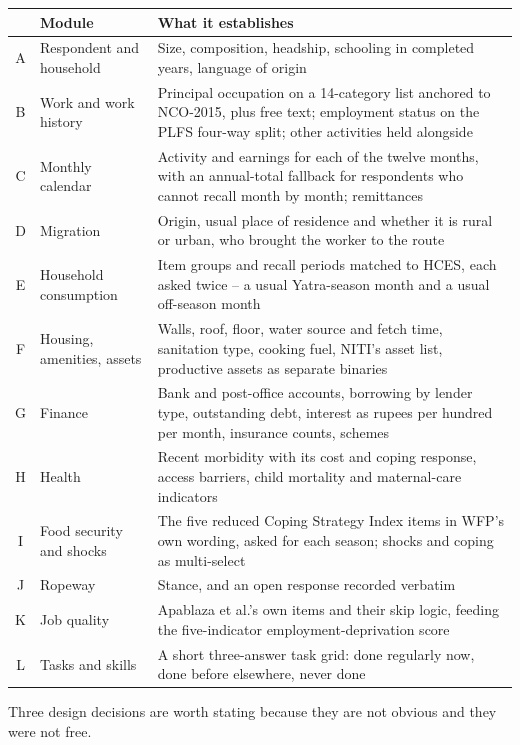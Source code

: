 \documentclass[11pt]{article}
\begin{document}
\begin{longtable}{@{}cl@{\hspace{1.2em}}p{8.4cm}@{}}
\toprule
& Module & What it establishes \\
\midrule
\endhead
A & Respondent and household & Size, composition, headship, schooling in completed years, language of origin \\
B & Work and work history & Principal occupation on a 14-category list anchored to NCO-2015, plus free text; employment status on the PLFS four-way split; other activities held alongside \\
C & Monthly calendar & Activity and earnings for each of the twelve months, with an annual-total fallback for respondents who cannot recall month by month; remittances \\
D & Migration & Origin, usual place of residence and whether it is rural or urban, who brought the worker to the route \\
E & Household consumption & Item groups and recall periods matched to HCES, each asked twice -- a usual Yatra-season month and a usual off-season month \\
F & Housing, amenities, assets & Walls, roof, floor, water source and fetch time, sanitation type, cooking fuel, NITI's asset list, productive assets as separate binaries \\
G & Finance & Bank and post-office accounts, borrowing by lender type, outstanding debt, interest as rupees per hundred per month, insurance counts, schemes \\
H & Health & Recent morbidity with its cost and coping response, access barriers, child mortality and maternal-care indicators \\
I & Food security and shocks & The five reduced Coping Strategy Index items in WFP's own wording, asked for each season; shocks and coping as multi-select \\
J & Ropeway & Stance, and an open response recorded verbatim \\
K & Job quality & Apablaza et al.'s own items and their skip logic, feeding the five-indicator employment-deprivation score \\
L & Tasks and skills & A short three-answer task grid: done regularly now, done before elsewhere, never done \\
\bottomrule
\end{longtable}

Three design decisions are worth stating because they are not obvious and they were not free.
\end{document}
